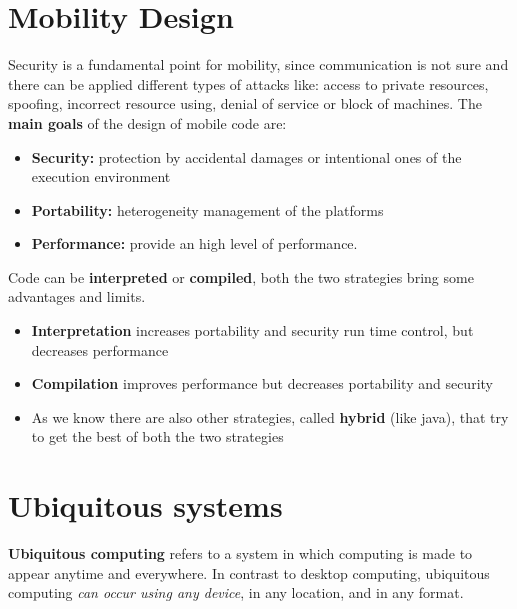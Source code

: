 \section{Mobility Design}
Security is a fundamental point for mobility, since communication is not sure and there can be applied different types of attacks like: access to private resources, spoofing, incorrect resource using, denial of service or block of machines. The \textbf{main goals} of the design of mobile code are:
\begin{itemize}
    \item \textbf{Security:} protection by accidental damages or intentional ones of the execution environment
    \item \textbf{Portability:} heterogeneity management of the platforms
    \item \textbf{Performance:} provide an high level of performance.
\end{itemize}
Code can be \textbf{interpreted} or \textbf{compiled}, both the two strategies bring some advantages and limits. 
\begin{itemize}
    \item \textbf{Interpretation} increases portability and security run time control, but decreases performance
    \item \textbf{Compilation} improves performance but decreases portability and security
    \item As we know there are also other strategies, called \textbf{hybrid} (like java), that try to get the best of both the two strategies
\end{itemize}

\section{Ubiquitous systems}
\textbf{Ubiquitous computing} refers to a system in which computing is made to appear anytime and everywhere. In contrast to desktop computing, ubiquitous computing \textit{can occur using any device}, in any location, and in any format.